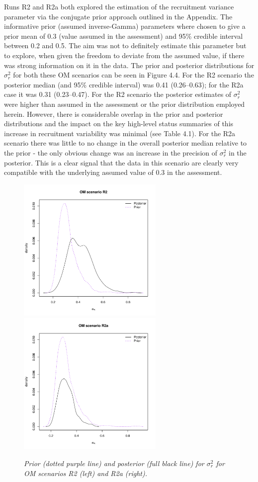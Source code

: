 \documentclass[11pt]{article}
\newcommand{\sigr}{\sigma^2_r}
\begin{document}
Runs R2 and R2a both explored the estimation of the recruitment variance parameter via the conjugate prior approach outlined in the Appendix. The informative prior (assumed inverse-Gamma) parameters where chosen to give a prior mean of 0.3 (value assumed in the assessment) and 95\% credible interval between 0.2 and 0.5. The aim was not to definitely estimate this parameter but to explore, when given the freedom to deviate from the assumed value, if there was strong information on it in the data. The prior and posterior distributions for $\sigr$ for both these OM scenarios can be seen in Figure 4.4. For the R2 scenario the posterior median (and 95\% credible interval) was 0.41 (0.26--0.63); for the R2a case it was 0.31 (0.23--0.47). For the R2 scenario the posterior estimates of $\sigr$ were higher than assumed in the assessment or the prior distribution employed herein. However, there is considerable overlap in the prior and posterior distributions and the impact on the key high-level status summaries of this increase in recruitment variability was minimal (see Table 4.1). For the R2a scenario there was little to no change in the overall posterior median relative to the prior - the only obvious change was an increase in the precision of $\sigr$ in the posterior. This is a clear signal that the data in this scenario are clearly very compatible with the underlying assumed value of 0.3 in the assessment.

\begin{figure}[hb]
    \begin{center}
       \includegraphics[width=7cm,height=7cm]{figs/pvsp_sigmar_R2.pdf}\includegraphics[width=7cm,height=7cm]{figs/pvsp_sigmar_R2a.pdf} 
    \end{center}
    \caption{\textit{Prior (dotted purple line) and posterior (full black line) for $\sigr$ for OM scenarios R2 (left) and R2a (right).}}
\end{figure}
\end{document}

